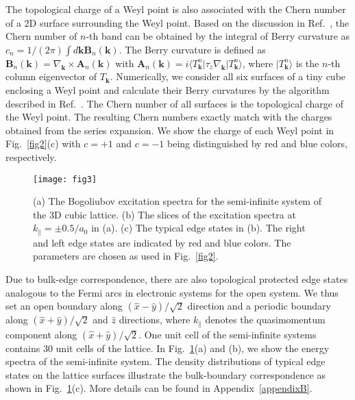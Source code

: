 \documentclass[aps,pra,floatfix,twocolumn,superscriptaddress]{revtex4-1}
\begin{document}
The topological charge of a Weyl point is also associated with the Chern number of a 2D surface surrounding the Weyl point. Based on the discussion in Ref.~\cite{PhysRevB.87.174427}, the Chern number of $n$-th band can be obtained by the integral of Berry curvature as $c_n=1/(2\pi)\int d\mathbf{k} \mathbf{B}_n(\mathbf{k})$. The Berry curvature is defined as $\mathbf{B}_n(\mathbf{k})=\nabla_\mathbf{k}\times \mathbf{A}_n(\mathbf{k})$ with $\mathbf{A}_n(\mathbf{k})=i\langle T^n_\mathbf{k}|\tau_z\nabla_\mathbf{k}|T^n_\mathbf{k}\rangle$, where $|T^n_\mathbf{k}\rangle$ is the $n$-th column eigenvector of $T_\mathbf{k}$. Numerically, we consider all six surfaces of a tiny cube enclosing a Weyl point and calculate their Berry curvatures by the algorithm described in Ref.~\cite{fukui2005chern}. The Chern number of all surfaces is the topological charge of the Weyl point. The resulting Chern numbers exactly match with the charges obtained from the series expansion. We show the charge of each Weyl point in Fig.~\ref{fig2}(c) with $c = + 1$ and $c = - 1$ being distinguished by red and blue colors, respectively.

\begin{figure}[htbp]
	\centering
	\texttt{[image: fig3]}
	\caption{(a) The Bogoliubov excitation spectra for the semi-infinite system of the 3D cubic lattice. (b) The slices of the excitation spectra at $k_\parallel=\pm 0.5/a_0$ in (a). (c) The typical edge states in (b). The right and left edge states are indicated by red and blue colors. The parameters are chosen as used in Fig.~\ref{fig2}.}
	\label{fig3}
\end{figure}

Due to bulk-edge correspondence, there are also topological protected edge states analogous to the Fermi arcs in electronic systems for the open system. We thus set an open boundary along $(\hat{x}-\hat{y})/\sqrt{2}$ direction and a periodic boundary along $(\hat{x}+\hat{y})/\sqrt{2}$ and $\hat{z}$ directions, where $k_\parallel$ denotes the quasimomentum component along $(\hat{x}+\hat{y})/\sqrt{2}$. One unit cell of the semi-infinite systems contains 30 unit cells of the lattice. In Fig.~\ref{fig3}(a) and (b), we show the energy spectra of the semi-infinite system. The density distributions of typical edge states on the lattice surfaces illustrate the bulk-boundary correspondence as shown in Fig.~\ref{fig3}(c). More details can be found in Appendix~\ref{appendixB}.
\end{document}
